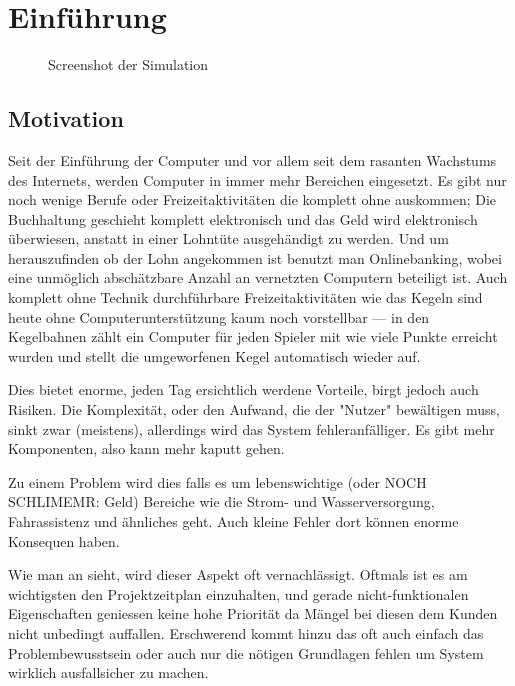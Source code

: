 \section{Einf{\"{u}}hrung}
\begin{figure}
	\centering
	\caption{Screenshot der Simulation}
	\label{fig:simulation}
\end{figure}

\subsection{Motivation} Seit der Einf{\"{u}}hrung der Computer und vor allem seit dem rasanten Wachstums des
Internets, werden Computer in immer mehr Bereichen eingesetzt. Es gibt nur noch wenige Berufe oder 
Freizeitaktivit{\"{a}}ten die komplett ohne auskommen; Die Buchhaltung geschieht komplett elektronisch und
das Geld wird elektronisch {\"{u}}berwiesen, anstatt in einer Lohnt{\"{u}}te ausgeh{\"{a}}ndigt zu werden.
Und um herauszufinden ob der Lohn angekommen ist benutzt man Onlinebanking, wobei eine
unm{\"{o}}glich absch{\"{a}}tzbare Anzahl an vernetzten Computern beteiligt ist. Auch komplett ohne Technik
durchf{\"{u}}hrbare Freizeitaktivit{\"{a}}ten wie das Kegeln sind heute ohne Computerunterst{\"{u}}tzung
kaum noch vorstellbar --- in den Kegelbahnen z{\"{a}}hlt ein Computer f{\"{u}}r jeden Spieler mit wie viele
Punkte erreicht wurden und stellt die umgeworfenen Kegel automatisch wieder auf.

Dies bietet enorme, jeden Tag ersichtlich werdene Vorteile, birgt jedoch auch Risiken. Die Komplexit{\"{a}}t,
oder den Aufwand, die der "Nutzer" bew{\"{a}}ltigen muss, sinkt zwar (meistens), allerdings wird das
System fehleranf{\"{a}}lliger. Es gibt mehr Komponenten, also kann mehr kaputt gehen.

Zu einem Problem wird dies falls es um lebenswichtige (oder NOCH SCHLIMEMR: Geld) Bereiche wie die
Strom- und Wasserversorgung, Fahrassistenz und {\"{a}}hnliches geht. Auch kleine Fehler dort k{\"{o}}nnen
enorme Konsequen haben. 

Wie man an  sieht, wird dieser Aspekt oft vernachl{\"{a}}ssigt. Oftmals ist es am wichtigsten den
Projektzeitplan einzuhalten, und gerade nicht-funktionalen Eigenschaften geniessen keine hohe Priorit{\"{a}}t da M{\"{a}}ngel
bei diesen dem Kunden nicht unbedingt auffallen. Erschwerend kommt hinzu das oft auch einfach das Problembewusstsein oder auch nur die
n{\"{o}}tigen Grundlagen fehlen um System wirklich ausfallsicher zu machen.

